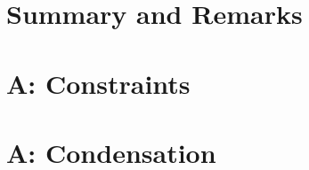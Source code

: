 \section{Summary and Remarks}



\newpage
\section{A: Constraints}

\newpage

\newpage
\section{A: Condensation}

\newpage
